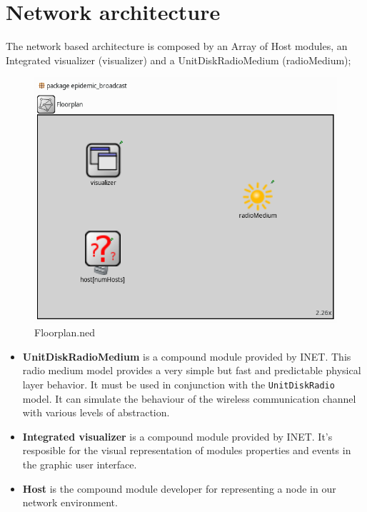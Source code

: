 \section{Network architecture}
The network based architecture is composed by an Array of Host modules, an
Integrated visualizer (visualizer) and a UnitDiskRadioMedium (radioMedium);
\begin{figure}[H]
    \begin{center}
        \includegraphics[scale=0.35]{img/floorplan.png}
        \caption{Floorplan.ned}
        \label{fig:single_queue}
    \end{center}
    \vspace*{-0.8cm}
\end{figure}
\begin{itemize}
    \item \textbf{UnitDiskRadioMedium} is a compound module provided by INET.
    This radio medium model provides a very simple but fast and predictable
    physical layer behavior. It must be used in conjunction with the
    \texttt{UnitDiskRadio} model. It can simulate the behaviour of the wireless
    communication channel with various levels of abstraction.
    \item \textbf{Integrated visualizer} is a compound module provided by INET.
    It's resposible for the visual representation of modules properties and
    events in the graphic user interface.
    \item \textbf{Host} is the compound module developer for representing a node
    in our network environment.
\end{itemize}
